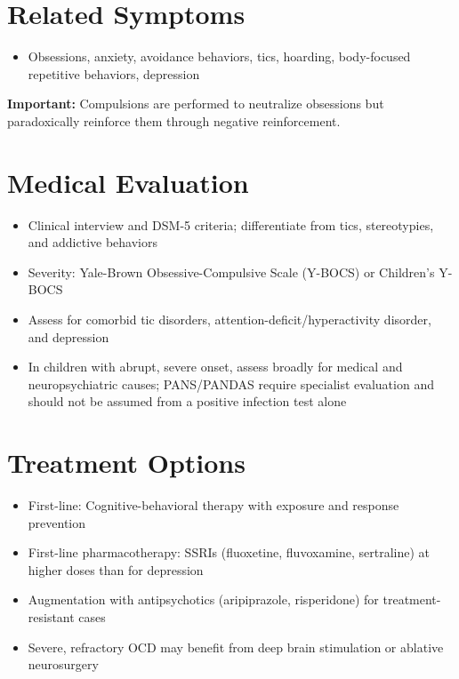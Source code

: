 \section*{Related Symptoms}
\begin{itemize}
  \item Obsessions, anxiety, avoidance behaviors, tics, hoarding, body-focused repetitive behaviors, depression
\end{itemize}
\textbf{Important:} Compulsions are performed to neutralize obsessions but paradoxically reinforce them through negative reinforcement.

\section*{Medical Evaluation}
\begin{itemize}
  \item Clinical interview and DSM-5 criteria; differentiate from tics, stereotypies, and addictive behaviors
  \item Severity: Yale-Brown Obsessive-Compulsive Scale (Y-BOCS) or Children's Y-BOCS
  \item Assess for comorbid tic disorders, attention-deficit/hyperactivity disorder, and depression
  \item In children with abrupt, severe onset, assess broadly for medical and neuropsychiatric causes; PANS/PANDAS require specialist evaluation and should not be assumed from a positive infection test alone
\end{itemize}

\section*{Treatment Options}
\begin{itemize}
  \item First-line: Cognitive-behavioral therapy with exposure and response prevention
  \item First-line pharmacotherapy: SSRIs (fluoxetine, fluvoxamine, sertraline) at higher doses than for depression
  \item Augmentation with antipsychotics (aripiprazole, risperidone) for treatment-resistant cases
  \item Severe, refractory OCD may benefit from deep brain stimulation or ablative neurosurgery
\end{itemize}

